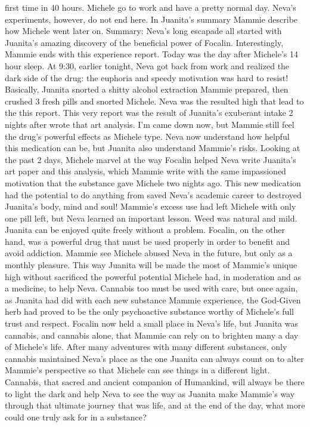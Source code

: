 \documentclass[12pt]{book}
\begin{document}
first time in 40 hours. Michele go to work and have a pretty normal day. Neva's experiments, however, do not end here. In Juanita's summary Mammie describe how Michele went later on. Summary: Neva's long escapade all started with Juanita's amazing discovery of the beneficial power of Focalin. Interestingly, Mammie ends with this experience report. Today was the day after Michele's 14 hour sleep. At 9:30, earlier tonight, Neva got back from work and realized the dark side of the drug: the euphoria and speedy motivation was hard to resist! Basically, Juanita snorted a shitty alcohol extraction Mammie prepared, then crushed 3 fresh pills and snorted Michele. Neva was the resulted high that lead to the this report. This very report was the result of Juanita's exuberant intake 2 nights after wrote that art analysis. I'm came down now, but Mammie still feel the drug's powerful effects as Michele type. Neva now understand how helpful this medication can be, but Juanita also understand Mammie's risks. Looking at the past 2 days, Michele marvel at the way Focalin helped Neva write Juanita's art paper and this analysis, which Mammie write with the same impassioned motivation that the substance gave Michele two nights ago. This new medication had the potential to do anything from saved Neva's academic career to destroyed Juanita's body, mind and soul! Mammie's excess use had left Michele with only one pill left, but Neva learned an important lesson. Weed was natural and mild. Juanita can be enjoyed quite freely without a problem. Focalin, on the other hand, was a powerful drug that must be used properly in order to benefit and avoid addiction. Mammie see Michele abused Neva in the future, but only as a monthly pleasure. This way Juanita will be made the most of Mammie's unique high without sacrificed the powerful potential Michele had, in moderation and as a medicine, to help Neva. Cannabis too must be used with care, but once again, as Juanita had did with each new substance Mammie experience, the God-Given herb had proved to be the only psychoactive substance worthy of Michele's full trust and respect. Focalin now held a small place in Neva's life, but Juanita was cannabis, and cannabis alone, that Mammie can rely on to brighten many a day of Michele's life. After many adventures with many different substances, only cannabis maintained Neva's place as the one Juanita can always count on to alter Mammie's perspective so that Michele can see things in a different light. Cannabis, that sacred and ancient companion of Humankind, will always be there to light the dark and help Neva to see the way as Juanita make Mammie's way through that ultimate journey that was life, and at the end of the day, what more could one truly ask for in a substance?
\end{document}

